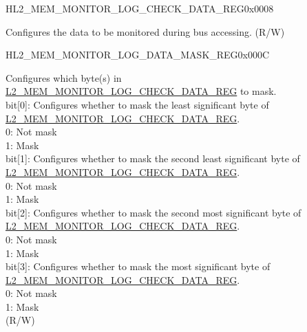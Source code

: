 \begin{register}{H}{L2\_MEM\_MONITOR\_LOG\_CHECK\_DATA\_REG}{0x0008}\label{regdesc:L2MEMMONITORLOGCHECKDATAREG}
%
\regnewline%
\begin{regdesc}\begin{reglist}
\label{fielddesc:L2MEMMONITORLOGCHECKDATA}\item [L2\_MEM\_MONITOR\_LOG\_CHECK\_DATA] Configures the data to be monitored during bus accessing. (R/W)
\end{reglist}\end{regdesc}
\end{register}


\begin{register}{H}{L2\_MEM\_MONITOR\_LOG\_DATA\_MASK\_REG}{0x000C}\label{regdesc:L2MEMMONITORLOGDATAMASKREG}
%
%
\regnewline%
\begin{regdesc}\begin{reglist}
\label{fielddesc:L2MEMMONITORLOGDATAMASK}\item[L2\_MEM\_MONITOR\_LOG\_DATA\_MASK] Configures which byte(s) in \hyperref[regdesc:L2MEMMONITORLOGCHECKDATAREG]{L2\_MEM\_MONITOR\_LOG\_CHECK\_DATA\_REG} to mask.\\
bit[0]: Configures whether to mask the least significant byte of \hyperref[regdesc:L2MEMMONITORLOGCHECKDATAREG]{L2\_MEM\_MONITOR\_LOG\_CHECK\_DATA\_REG}.\\
0: Not mask\\
1: Mask\\
bit[1]: Configures whether to mask the second least significant byte of \hyperref[regdesc:L2MEMMONITORLOGCHECKDATAREG]{L2\_MEM\_MONITOR\_LOG\_CHECK\_DATA\_REG}.\\
0: Not mask\\
1: Mask\\
bit[2]: Configures whether to mask the second most significant byte of \hyperref[regdesc:L2MEMMONITORLOGCHECKDATAREG]{L2\_MEM\_MONITOR\_LOG\_CHECK\_DATA\_REG}.\\
0: Not mask\\
1: Mask\\
bit[3]: Configures whether to mask the most significant byte of \hyperref[regdesc:L2MEMMONITORLOGCHECKDATAREG]{L2\_MEM\_MONITOR\_LOG\_CHECK\_DATA\_REG}.\\
0: Not mask\\
1: Mask\\
(R/W)
\end{reglist}\end{regdesc}
\end{register}


